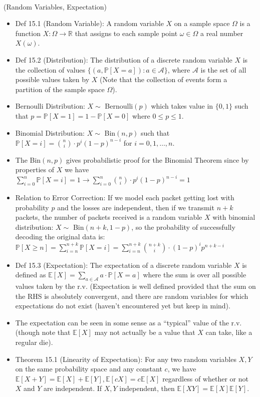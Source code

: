 \documentclass{article}
\begin{document}
 \\
(Random Variables, Expectation)
\begin{itemize}
	\item Def 15.1 (Random Variable): A random variable $X$ on a sample space $\Omega$ is a function $X: \Omega\rightarrow\mathbb{R}$ that assigns to each sample point $\omega\in\Omega$ a real number $X(\omega)$.
	\item Def 15.2 (Distribution): The distribution of a discrete random variable $X$ is the collection of values $\{(a,\mathbb{P}[X = a]): a\in\mathscr{A}\}$, where $\mathscr{A}$ is the set of all possible values taken by $X$ (Note that the collection of events form a partition of the sample space $\Omega$).
	\item Bernoulli Distribution: $X\sim$ Bernoulli$(p)$ which takes value in $\{0,1\}$ such that $p = \mathbb{P}[X=1] = 1-\mathbb{P}[X=0]$ where $0\leq p\leq1$.
	\item Binomial Distribution: $X\sim$ Bin$(n,p)$ such that $\mathbb{P}[X=i] = \binom{n}{i}\cdot p^i(1-p)^{n-i}$ for $i=0,1,\dots,n$.
	\item The Bin$(n,p)$ gives probabilistic proof for the Binomial Theorem since by properties of $X$ we have $\sum\limits_{i=0}^n \mathbb{P}[X=i] = 1 \longrightarrow \sum\limits_{i=0}^n \binom{n}{i}\cdot p^i(1-p)^{n-i} = 1$
	\item Relation to Error Correction: If we model each packet getting lost with probability $p$ and the losses are independent, then if we transmit $n+k$ packets, the number of packets received is a random variable $X$ with binomial distribution: $X\sim$ Bin$(n+k, 1-p)$, so the probability of successfully decoding the original data is: $\mathbb{P}[X\geq n] = \sum\limits_{i=n}^{n+k}\mathbb{P}[X=i] = \sum\limits_{i=n}^{n+k} \binom{n+k}{i}\cdot (1-p)^i p^{n+k-i}$
	\item Def 15.3 (Expectation): The expectation of a discrete random variable $X$ is defined as $\mathbb{E}[X] = \sum\limits_{a\in\mathscr{A}} a\cdot\mathbb{P}[X=a]$ where the sum is over all possible values taken by the r.v. (Expectation is well defined provided that the sum on the RHS is absolutely convergent, and there are random variables for which expectations do not exist (haven't encountered yet but keep in mind).
	\item The expectation can be seen in some sense as a ``typical'' value of the r.v. (though note that $\mathbb{E}[X]$ may not actually be a value that $X$ can take, like a regular die).
	\item Theorem 15.1 (Linearity of Expectation): For any two random variables $X,Y$ on the same probability space and any constant $c$, we have $\mathbb{E}[X+Y] = \mathbb{E}[X] + \mathbb{E}[Y], \mathbb{E}[cX] = c\mathbb{E}[X]$ regardless of whether or not $X$ and $Y$ are independent. If $X,Y$ independent, then $\mathbb{E}[XY] = \mathbb{E}[X]\mathbb{E}[Y]$.

\end{itemize}
\end{document}
